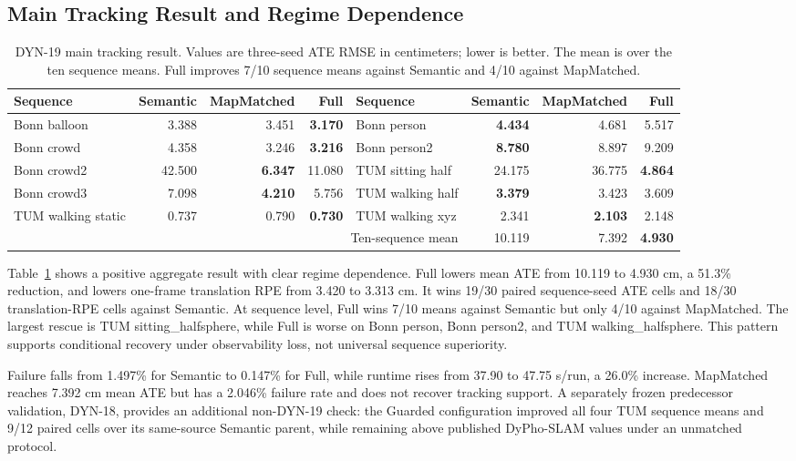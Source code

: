 \subsection{Main Tracking Result and Regime Dependence}

\begin{table}[t]
\centering
\caption{DYN-19 main tracking result. Values are three-seed ATE RMSE in centimeters; lower is better. The mean is over the ten sequence means. Full improves 7/10 sequence means against Semantic and 4/10 against MapMatched.}
\label{tab:dyn19-main}
\footnotesize
\begin{tabular}{lrrrlrrr}
\toprule
Sequence & Semantic & MapMatched & Full & Sequence & Semantic & MapMatched & Full \\
\midrule
Bonn balloon & 3.388 & 3.451 & \textbf{3.170} & Bonn person & \textbf{4.434} & 4.681 & 5.517 \\
Bonn crowd & 4.358 & 3.246 & \textbf{3.216} & Bonn person2 & \textbf{8.780} & 8.897 & 9.209 \\
Bonn crowd2 & 42.500 & \textbf{6.347} & 11.080 & TUM sitting half & 24.175 & 36.775 & \textbf{4.864} \\
Bonn crowd3 & 7.098 & \textbf{4.210} & 5.756 & TUM walking half & \textbf{3.379} & 3.423 & 3.609 \\
TUM walking static & 0.737 & 0.790 & \textbf{0.730} & TUM walking xyz & 2.341 & \textbf{2.103} & 2.148 \\
\midrule
\multicolumn{5}{r}{Ten-sequence mean} & 10.119 & 7.392 & \textbf{4.930} \\
\bottomrule
\end{tabular}
\end{table}

Table~\ref{tab:dyn19-main} shows a positive aggregate result with clear regime dependence.
Full lowers mean ATE from 10.119 to 4.930 cm, a 51.3\% reduction, and lowers one-frame translation RPE from 3.420 to 3.313 cm.
It wins 19/30 paired sequence-seed ATE cells and 18/30 translation-RPE cells against Semantic.
At sequence level, Full wins 7/10 means against Semantic but only 4/10 against MapMatched.
The largest rescue is TUM sitting\_halfsphere, while Full is worse on Bonn person, Bonn person2, and TUM walking\_halfsphere.
This pattern supports conditional recovery under observability loss, not universal sequence superiority.

Failure falls from 1.497\% for Semantic to 0.147\% for Full, while runtime rises from 37.90 to 47.75 s/run, a 26.0\% increase.
MapMatched reaches 7.392 cm mean ATE but has a 2.046\% failure rate and does not recover tracking support.
A separately frozen predecessor validation, DYN-18, provides an additional non-DYN-19 check: the Guarded configuration improved all four TUM sequence means and 9/12 paired cells over its same-source Semantic parent, while remaining above published DyPho-SLAM values under an unmatched protocol.

